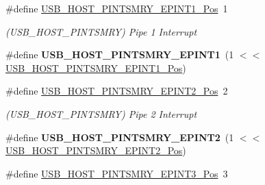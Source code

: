 \begin{DoxyCompactItemize}
\item 
\hypertarget{group___s_a_m_l21___u_s_b_gaec583c439db54f9bc7fa00afafae348e}{}\#define \hyperlink{group___s_a_m_l21___u_s_b_gaec583c439db54f9bc7fa00afafae348e}{U\+S\+B\+\_\+\+H\+O\+S\+T\+\_\+\+P\+I\+N\+T\+S\+M\+R\+Y\+\_\+\+E\+P\+I\+N\+T1\+\_\+\+Pos}~1\label{group___s_a_m_l21___u_s_b_gaec583c439db54f9bc7fa00afafae348e}

\begin{DoxyCompactList}\small\item\em (U\+S\+B\+\_\+\+H\+O\+S\+T\+\_\+\+P\+I\+N\+T\+S\+M\+R\+Y) Pipe 1 Interrupt \end{DoxyCompactList}\item 
\hypertarget{group___s_a_m_l21___u_s_b_gabd73a5cf0150dcac6bca2cb83d9b3fdc}{}\#define {\bfseries U\+S\+B\+\_\+\+H\+O\+S\+T\+\_\+\+P\+I\+N\+T\+S\+M\+R\+Y\+\_\+\+E\+P\+I\+N\+T1}~(1 $<$$<$ \hyperlink{group___s_a_m_l21___u_s_b_gaec583c439db54f9bc7fa00afafae348e}{U\+S\+B\+\_\+\+H\+O\+S\+T\+\_\+\+P\+I\+N\+T\+S\+M\+R\+Y\+\_\+\+E\+P\+I\+N\+T1\+\_\+\+Pos})\label{group___s_a_m_l21___u_s_b_gabd73a5cf0150dcac6bca2cb83d9b3fdc}

\item 
\hypertarget{group___s_a_m_l21___u_s_b_ga79d1d05cc95207184b9b4f7585c2d595}{}\#define \hyperlink{group___s_a_m_l21___u_s_b_ga79d1d05cc95207184b9b4f7585c2d595}{U\+S\+B\+\_\+\+H\+O\+S\+T\+\_\+\+P\+I\+N\+T\+S\+M\+R\+Y\+\_\+\+E\+P\+I\+N\+T2\+\_\+\+Pos}~2\label{group___s_a_m_l21___u_s_b_ga79d1d05cc95207184b9b4f7585c2d595}

\begin{DoxyCompactList}\small\item\em (U\+S\+B\+\_\+\+H\+O\+S\+T\+\_\+\+P\+I\+N\+T\+S\+M\+R\+Y) Pipe 2 Interrupt \end{DoxyCompactList}\item 
\hypertarget{group___s_a_m_l21___u_s_b_ga71a8e516c4492f85bb3ba06002c95a7d}{}\#define {\bfseries U\+S\+B\+\_\+\+H\+O\+S\+T\+\_\+\+P\+I\+N\+T\+S\+M\+R\+Y\+\_\+\+E\+P\+I\+N\+T2}~(1 $<$$<$ \hyperlink{group___s_a_m_l21___u_s_b_ga79d1d05cc95207184b9b4f7585c2d595}{U\+S\+B\+\_\+\+H\+O\+S\+T\+\_\+\+P\+I\+N\+T\+S\+M\+R\+Y\+\_\+\+E\+P\+I\+N\+T2\+\_\+\+Pos})\label{group___s_a_m_l21___u_s_b_ga71a8e516c4492f85bb3ba06002c95a7d}

\item 
\hypertarget{group___s_a_m_l21___u_s_b_ga00aacb23160ff0d107bee920b6fcba8c}{}\#define \hyperlink{group___s_a_m_l21___u_s_b_ga00aacb23160ff0d107bee920b6fcba8c}{U\+S\+B\+\_\+\+H\+O\+S\+T\+\_\+\+P\+I\+N\+T\+S\+M\+R\+Y\+\_\+\+E\+P\+I\+N\+T3\+\_\+\+Pos}~3\label{group___s_a_m_l21___u_s_b_ga00aacb23160ff0d107bee920b6fcba8c}


\end{DoxyCompactItemize}
